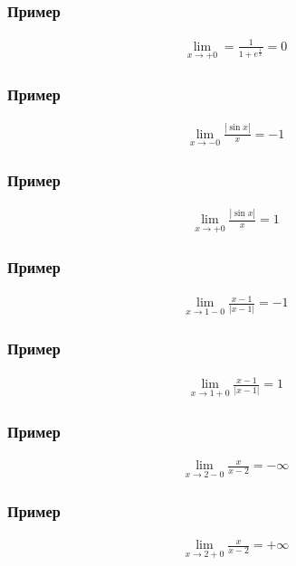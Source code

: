 \documentclass{article}
\begin{document}
\subsubsection{Пример}
\begin{gather*}
    \lim_{x \to +0} = \frac{1}{1 + e^\frac{1}{x}} = 0
\end{gather*}

\subsubsection{Пример}
\begin{gather*}
    \lim_{x \to -0} \frac{|\sin x|}{x} = -1
\end{gather*}

\subsubsection{Пример}
\begin{gather*}
    \lim_{x \to +0} \frac{|\sin x|}{x} = 1
\end{gather*}

\subsubsection{Пример}
\begin{gather*}
    \lim_{x \to 1 - 0} \frac{x - 1}{|x - 1|} = -1
\end{gather*}

\subsubsection{Пример}
\begin{gather*}
    \lim_{x \to 1 + 0} \frac{x - 1}{|x - 1|} = 1
\end{gather*}

\subsubsection{Пример}
\begin{gather*}
    \lim_{x \to 2 - 0} \frac{x}{x - 2} = -\infty
\end{gather*}

\subsubsection{Пример}
\begin{gather*}
    \lim_{x \to 2 + 0} \frac{x}{x - 2} = +\infty
\end{gather*}
\end{document}
